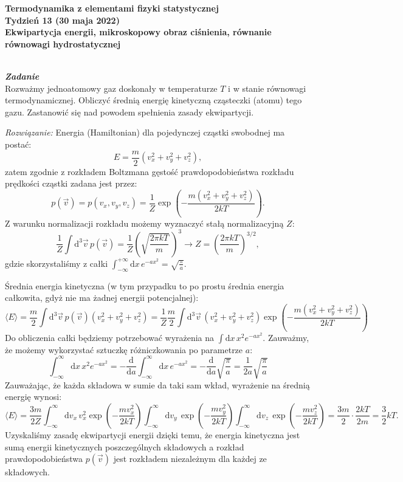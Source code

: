 \documentclass[11pt,a4paper]{article}
\newcounter{zadanie}\newcommand{\zadanie}[1][]{\addtocounter{zadanie}{1} ~\\  {\bf \emph{Zadanie \arabic{zadanie} #1 }} \\}
\renewcommand{\t}[1]{\textrm{#1}}
\begin{document}
\begin{centering}
\bf{\Large{Termodynamika z elementami fizyki statystycznej}}\\
Tydzień 13 (30 maja 2022)\\[5mm]
Ekwipartycja energii, mikroskopowy obraz ciśnienia, równanie równowagi hydrostatycznej\\
\end{centering}
\vspace{10mm}


\zadanie
Rozważmy jednoatomowy gaz doskonały w temperaturze $T$ i w stanie równowagi termodynamicznej.
Obliczyć średnią energię kinetyczną cząsteczki (atomu) tego gazu.
Zastanowić się nad powodem spełnienia zasady ekwipartycji.
\newline

\emph{Rozwiązanie:} Energia (Hamiltonian) dla pojedynczej cząstki swobodnej ma postać:
$$
E = \frac{m}{2}(v_x^2 + v_y^2 + v_z^2),
$$
zatem zgodnie z rozkładem Boltzmana gęstość prawdopodobieństwa rozkładu prędkości cząstki zadana jest przez:
$$
p(\vec{v}) = p(v_x,v_y,v_z) = \frac{1}{Z}\exp\left(-\frac{m(v_x^2+v_y^2+ v_z^2)}{2 k T}  \right).
$$
Z warunku normalizacji rozkładu możemy wyznaczyć stałą  normalizacyjną $Z$:
$$
\frac{1}{Z}\int \textrm{d}^3 \vec{v} \, p(\vec{v}) = \frac{1}{Z} \left( \sqrt{\frac{2 \pi k T }{m}}\,\right)^3 \longrightarrow Z = \left(\frac{2 \pi k T }{m}\right)^{3/2},
$$
gdzie skorzystaliśmy z całki $\int_{-\infty}^{+\infty} \textrm{d}x\, e^{-a x^2} = \sqrt{\frac{\pi}{a}}$.

Średnia energia kinetyczna (w tym przypadku to po prostu średnia energia całkowita, gdyż nie ma żadnej energii potencjalnej):
$$
\langle E \rangle = \frac{m}{2} \int \textrm{d}^3 \vec{v}\,
p(\vec{v})(v_x^2 + v_y^2 + v_z^2) = \frac{1}{Z} \frac{m}{2} \int \textrm{d}^3\vec{v}\, (v_x^2+v_y^2+v_z^2) \exp\left(- \frac{m(v_x^2+v_y^2+ v_z^2)}{2 k T}   \right)
$$
Do obliczenia całki będziemy potrzebować wyrażenia na $\int \t{d} x \, x^2 e^{-a x^2}$.
Zauważmy, że możemy wykorzystać sztuczkę różniczkowania po parametrze $a$:
$$
\int_{-\infty}^{\infty} \t{d} x \, x^2 e^{-a x^2} = - \frac{\t{d}}{\t{d}a} \int_{-\infty}^{\infty} \t{d} x\, e^{-a x^2} = - \frac{\t{d}}{\t{d}a} \sqrt{\frac{\pi}{a}} = \frac{1}{2a }\sqrt{\frac{\pi}{a}}
$$
Zauważając, że każda składowa w sumie da taki sam wkład, wyrażenie na średnią energię wynosi:
$$
\langle E \rangle =  \frac{3 m}{2 Z} \int_{-\infty}^\infty \textrm{d}v_x\,  v_x^2 \exp\left(-\frac{m v_x^2}{2 k T}\right) \int_{-\infty}^{\infty} \textrm{d}v_y\,  \exp\left(-\frac{m v_y^2}{2 k T}\right)\int_{-\infty}^\infty \textrm{d}v_z\,  \exp\left(-\frac{m v_z^2}{2 k T}\right) =  \frac{3m}{2} \cdot \frac{2 k T}{2 m } = \frac{3}{2} k T.
$$
Uzyskaliśmy zasadę ekwipartycji energii dzięki temu, że energia kinetyczna jest sumą energii kinetycznych poszczególnych składowych a rozkład prawdopodobieństwa $p(\vec{v})$ jest rozkładem niezależnym dla każdej ze składowych.
\end{document}
